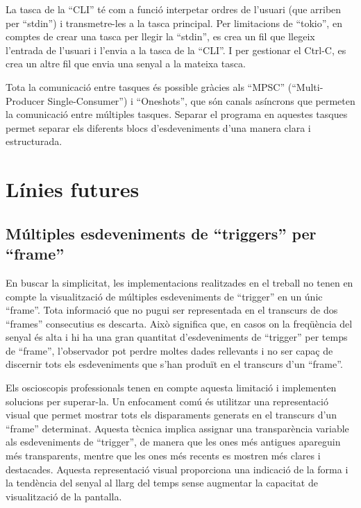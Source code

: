 \documentclass{tfgitic}[2023/06/30]
\begin{document}
La tasca de la ``CLI'' té com a funció interpetar ordres de l'usuari
(que arriben per ``stdin'') i transmetre-les a la tasca principal.
Per limitacions de ``tokio'', en comptes de crear una tasca per llegir
la ``stdin'', es crea un fil que llegeix l'entrada de l'usuari i
l'envia a la tasca de la ``CLI''. I per gestionar el Ctrl-C, es crea
un altre fil que envia una senyal a la mateixa tasca.

Tota la comunicació entre tasques és possible gràcies als ``MPSC''
(``Multi-Producer Single-Consumer'') i ``Oneshots'', que són canals
asíncrons que permeten la comunicació entre múltiples tasques. Separar
el programa en aquestes tasques permet separar els diferents blocs
d'esdeveniments d'una manera clara i estructurada.

\chapter{Línies futures}

\section{Múltiples esdeveniments de ``triggers'' per ``frame''}

En buscar la simplicitat, les implementacions realitzades en el
treball no tenen en compte la visualització de múltiples esdeveniments
de ``trigger'' en un únic ``frame''.  Tota informació que no pugui ser
representada en el transcurs de dos ``frames'' consecutius es
descarta.  Això significa que, en casos on la freqüència del senyal és
alta i hi ha una gran quantitat d'esdeveniments de ``trigger'' per
temps de ``frame'', l'observador pot perdre moltes dades rellevants i
no ser capaç de discernir tots els esdeveniments que s'han produït en
el transcurs d'un ``frame''.

Els osci\lgem oscopis professionals tenen en compte aquesta limitació
i implementen solucions per superar-la. Un enfocament comú és
utilitzar una representació visual que permet mostrar tots els
disparaments generats en el transcurs d'un ``frame''
determinat. Aquesta tècnica implica assignar una transparència
variable als esdeveniments de ``trigger'', de manera que les ones més
antigues apareguin més transparents, mentre que les ones més recents
es mostren més clares i destacades. Aquesta representació visual
proporciona una indicació de la forma i la tendència del senyal al
llarg del temps sense augmentar la capacitat de visualització de la
pantalla.
\end{document}
